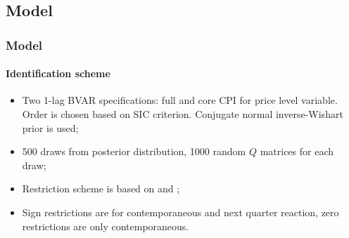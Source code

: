 \documentclass{beamer}
\begin{document}
\subsection{Model}
\begin{frame}
\frametitle{Model}
\framesubtitle{Identification scheme}
\begin{itemize}
	\item Two 1-lag BVAR specifications: full and core CPI for price level variable. Order is chosen based on SIC criterion. Conjugate normal inverse-Wishart prior is used;
	\item 500 draws from posterior distribution, 1000 random $Q$ matrices for each draw;
	\item Restriction scheme is based on \parencite{Forbes2018} and \parencite{Sinyakov2019};
	\item Sign restrictions are for contemporaneous and next quarter reaction, zero restrictions are only contemporaneous.
	\begin{table}[h!]
		\centering
		\label{tab:signs_and_zeros}
	\end{table}
\end{itemize}
\end{frame}
\end{document}

